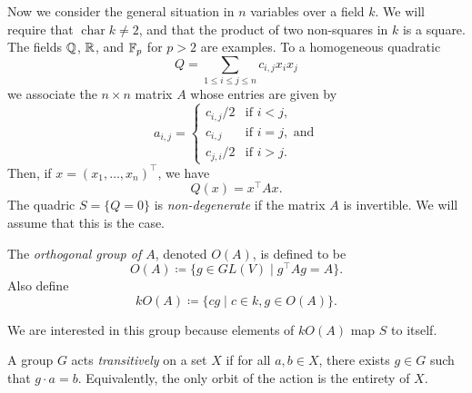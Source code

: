 Now we consider the general situation in $n$ variables over a field $k$. We will require that $\operatorname{char} k \neq 2$, and that the product of two non-squares in $k$ is a square. The fields $\mathbb{Q}$, $\mathbb{R}$, and $\mathbb{F}_p$ for $p>2$ are examples. To a homogeneous quadratic
\[
	Q = \sum_{1 \leq i \leq j \leq n} c_{i,j} x_i x_j 
\]
we associate the $n\times n$ matrix $A$ whose entries are given by
\[
	a_{i,j} = \begin{cases}
		{c_{i,j}}/{2} & \text{if } i < j,\\
		c_{i,j} & \text{if } i = j, \text{ and}\\
		{c_{j,i}}/{2} & \text{if } i > j.
	\end{cases}
\]
Then, if $x = (x_1,\ldots,x_n)^\top$, we have
\[
	Q(x) = x^\top A x.
\]
The quadric $S = \{Q = 0\}$ is \emph{non-degenerate} if the matrix $A$ is invertible. We will assume that this is the case.

\begin{defn}
	The \emph{orthogonal group of $A$}, denoted $O(A)$, is defined to be
	\[
		O(A) \coloneqq \{ g \in GL(V) \mid g^\top A g = A\}.
	\]
	Also define
	\[
		kO(A) \coloneqq \{ cg \mid c\in k, g\in O(A)\}.
	\]
\end{defn}

We are interested in this group because elements of $kO(A)$ map $S$ to itself.
\begin{defn}
	A group $G$ acts \emph{transitively} on a set $X$ if for all $a,b\in X$, there exists $g\in G$ such that $g\cdot a = b$. Equivalently, the only orbit of the action is the entirety of $X$.
\end{defn}

